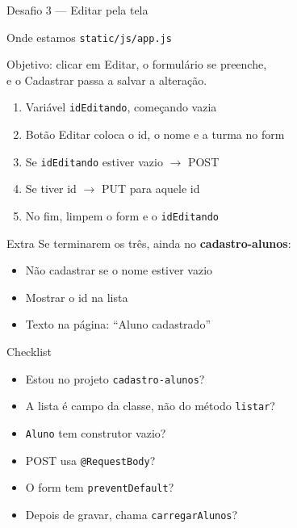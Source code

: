 \documentclass[aspectratio=169,11pt]{beamer}
\newcommand{\onde}[1]{%
  \begin{block}{Onde estamos}
    #1
  \end{block}
}
\begin{document}
\begin{frame}{Desafio 3 --- Editar pela tela}
  \onde{\texttt{static/js/app.js}}

  Objetivo: clicar em Editar, o formulário se preenche,\\
  e o Cadastrar passa a salvar a alteração.

  \vspace{0.4em}
  \begin{enumerate}
    \item Variável \texttt{idEditando}, começando vazia
    \item Botão Editar coloca o id, o nome e a turma no form
    \item Se \texttt{idEditando} estiver vazio $\rightarrow$ POST
    \item Se tiver id $\rightarrow$ PUT para aquele id
    \item No fim, limpem o form e o \texttt{idEditando}
  \end{enumerate}
\end{frame}

\begin{frame}{Extra}
  Se terminarem os três, ainda no \textbf{cadastro-alunos}:

  \vspace{0.4em}
  \begin{itemize}
    \item Não cadastrar se o nome estiver vazio
    \item Mostrar o id na lista
    \item Texto na página: ``Aluno cadastrado''
  \end{itemize}
\end{frame}

\begin{frame}{Checklist}
  \begin{itemize}
    \item [ ] Estou no projeto \texttt{cadastro-alunos}?
    \item [ ] A lista é campo da classe, não do método
              \texttt{listar}?
    \item [ ] \texttt{Aluno} tem construtor vazio?
    \item [ ] POST usa \texttt{@RequestBody}?
    \item [ ] O form tem \texttt{preventDefault}?
    \item [ ] Depois de gravar, chama \texttt{carregarAlunos}?
  \end{itemize}
\end{frame}
\end{document}
